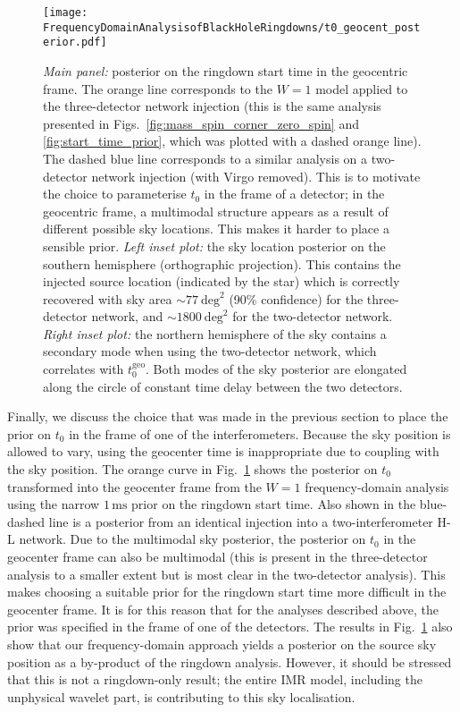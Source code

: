 \begin{figure}[t!]
    \centering
    \texttt{[image: FrequencyDomainAnalysisofBlackHoleRingdowns/t0\_geocent\_posterior.pdf]}
    \caption[Posteriors on the ringdown start time]{ 
    \emph{Main panel:} posterior on the ringdown start time in the geocentric frame. The orange line corresponds to the $W=1$ model applied to the three-detector network injection (this is the same analysis presented in Figs.~\ref{fig:mass_spin_corner_zero_spin} and \ref{fig:start_time_prior}, which was plotted with a dashed orange line). 
    The dashed blue line corresponds to a similar analysis on a two-detector network injection (with Virgo removed). This is to motivate the choice to parameterise $t_0$ in the frame of a detector; in the geocentric frame, a multimodal structure appears as a result of different possible sky locations. This makes it harder to place a sensible prior.
    \emph{Left inset plot:} the sky location posterior on the southern hemisphere (orthographic projection). This contains the injected source location (indicated by the star) which is correctly recovered with sky area $\sim 77\ \mathrm{deg}^2$ (90\% confidence) for the three-detector network, and $\sim 1800\ \mathrm{deg}^2$ for the two-detector network.
    \emph{Right inset plot:} the northern hemisphere of the sky contains a secondary mode when using the two-detector network, which correlates with $t_0^\mathrm{geo}$. Both modes of the sky posterior are elongated along the circle of constant time delay between the two detectors.
    }
    \label{fig:t0_geocent_posterior}
\end{figure}

Finally, we discuss the choice that was made in the previous section to place the prior on $t_0$ in the frame of one of the interferometers.
Because the sky position is allowed to vary, using the geocenter time is inappropriate due to coupling with the sky position.
The orange curve in Fig.~\ref{fig:t0_geocent_posterior} shows the posterior on $t_0$ transformed into the geocenter frame from the $W=1$ frequency-domain analysis using the narrow $1\,\mathrm{ms}$ prior on the ringdown start time. 
Also shown in the blue-dashed line is a posterior from an identical injection into a two-interferometer H-L network.
Due to the multimodal sky posterior, the posterior on $t_0$ in the geocenter frame can also be multimodal (this is present in the three-detector analysis to a smaller extent but is most clear in the two-detector analysis).
This makes choosing a suitable prior for the ringdown start time more difficult in the geocenter frame.
It is for this reason that for the analyses described above, the prior was specified in the frame of one of the detectors.
The results in Fig.~\ref{fig:t0_geocent_posterior} also show that our frequency-domain approach yields a posterior on the source sky position as a by-product of the ringdown analysis. However, it should be stressed that this is not a ringdown-only result; the entire IMR model, including the unphysical wavelet part, is contributing to this sky localisation.


